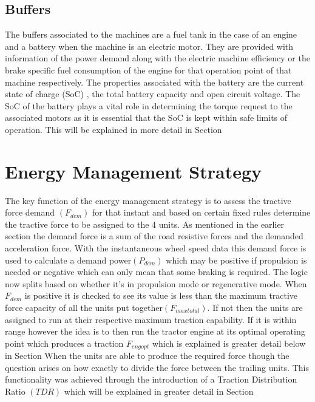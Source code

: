 \documentclass[MastersThesis.tex]{subfiles}
\begin{document}
\subsection{Buffers} \label{sec:bufferstructure}
The buffers associated to the machines are a fuel tank in the case of an engine and a battery when the machine is an electric motor. They are provided with information of the power demand along with the electric machine efficiency or the brake specific fuel consumption of the engine for that operation point of that machine respectively.  
The properties associated with the battery are the current state of charge (SoC) , the total battery capacity and open circuit voltage. The SoC of the battery plays a vital role in determining the torque request to the associated motors as it is essential that the SoC is kept within safe limits of operation. This will be explained in more detail in Section %

\section{Energy Management Strategy}
The key function of the energy management strategy is to assess the tractive force demand $(F_{dem})$ for that instant and based on certain fixed rules determine the tractive force to be assigned to the 4 units. As mentioned in the earlier section the demand force is a sum of the road resistive forces and the demanded acceleration force. With the instantaneous wheel speed data this demand force is used to calculate a demand power$(P_{dem})$ which may be positive if propulsion is needed or negative which can only mean that some braking is required. 
The logic now splits based on whether it’s in propulsion mode or regenerative mode. When $F_{dem}$ is positive it is checked to see its value is less than the maximum tractive force capacity of all the units put together$(F_{maxtotal})$. If not then the units are assigned to run at their respective maximum traction capability. If it is within range however the idea is to then run the tractor engine at its optimal operating point which produces a traction $F_{engopt}$ which is explained is greater detail below in Section %
When the units are able to produce the required force though the question arises on how exactly to divide the force between the trailing units. This functionality was achieved through the introduction of a Traction Distribution Ratio $(TDR)$ which will be explained in greater detail in Section %
\end{document}
